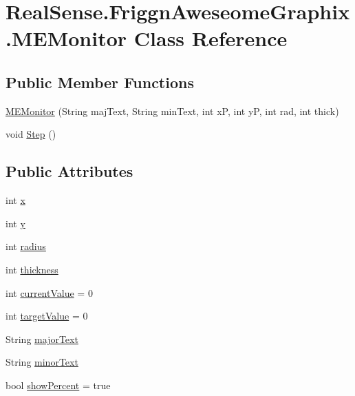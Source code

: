 \hypertarget{class_real_sense_1_1_friggn_aweseome_graphix_1_1_m_e_monitor}{}\section{Real\+Sense.\+Friggn\+Aweseome\+Graphix.\+M\+E\+Monitor Class Reference}
\label{class_real_sense_1_1_friggn_aweseome_graphix_1_1_m_e_monitor}
\subsection*{Public Member Functions}
\begin{DoxyCompactItemize}
\item 
\hyperlink{class_real_sense_1_1_friggn_aweseome_graphix_1_1_m_e_monitor_a8df7ffb411949e73cc37344326d325a3}{M\+E\+Monitor} (String maj\+Text, String min\+Text, int xP, int yP, int rad, int thick)
\item 
void \hyperlink{class_real_sense_1_1_friggn_aweseome_graphix_1_1_m_e_monitor_aa55989a875d2fd83969adb5388c691f1}{Step} ()
\end{DoxyCompactItemize}
\subsection*{Public Attributes}
\begin{DoxyCompactItemize}
\item 
int \hyperlink{class_real_sense_1_1_friggn_aweseome_graphix_1_1_m_e_monitor_aae94a9af9eba40d10677cffeee537737}{x}
\item 
int \hyperlink{class_real_sense_1_1_friggn_aweseome_graphix_1_1_m_e_monitor_a05c8b06b952fbdfff729f92498996212}{y}
\item 
int \hyperlink{class_real_sense_1_1_friggn_aweseome_graphix_1_1_m_e_monitor_aac6a6a6847e001a75e2b2316386ee864}{radius}
\item 
int \hyperlink{class_real_sense_1_1_friggn_aweseome_graphix_1_1_m_e_monitor_abb4069ab5c96cb77807c8ec988073bb0}{thickness}
\item 
int \hyperlink{class_real_sense_1_1_friggn_aweseome_graphix_1_1_m_e_monitor_adc8792c41789b6f038d7dc5d5c6e7496}{current\+Value} = 0
\item 
int \hyperlink{class_real_sense_1_1_friggn_aweseome_graphix_1_1_m_e_monitor_aa73071b1e565f6765783baf18ce5b2c7}{target\+Value} = 0
\item 
String \hyperlink{class_real_sense_1_1_friggn_aweseome_graphix_1_1_m_e_monitor_a4cdd7aad6b3e84b9429518891618b195}{major\+Text}
\item 
String \hyperlink{class_real_sense_1_1_friggn_aweseome_graphix_1_1_m_e_monitor_a6bbf9a1ee06067597b933da3e34e3ee5}{minor\+Text}
\item 
bool \hyperlink{class_real_sense_1_1_friggn_aweseome_graphix_1_1_m_e_monitor_a4a07682a2e90f7433ae6fdb9df8f9b97}{show\+Percent} = true
\end{DoxyCompactItemize}


